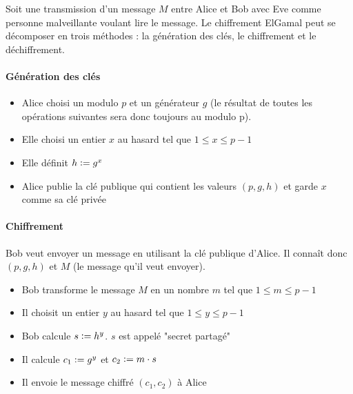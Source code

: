 \documentclass[10pt,a4paper,twoside]{article}
\newcommand{\defeq}{\vcentcolon=}
\numberwithin{equation}{section}
\begin{document}
			Soit une transmission d'un message $M$ entre Alice et Bob avec Eve comme personne malveillante voulant lire le message.
			Le chiffrement ElGamal peut se décomposer en trois méthodes : la génération des clés, le chiffrement et le déchiffrement.
			\paragraph{Génération des clés}
				\begin{itemize}
					\item Alice choisi un modulo $p$ et un générateur $g$ (le résultat de toutes les opérations suivantes sera donc toujours au modulo p).
					\item Elle choisi un entier $x$ au hasard tel que $1 \leq x \leq p-1$
					\item Elle définit $h \defeq g^x$
					\item Alice publie la clé publique qui contient les valeurs $(p,g,h)$ et garde $x$ comme sa clé privée
				\end{itemize}
				
			\paragraph{Chiffrement}
				Bob veut envoyer un message en utilisant la clé publique d'Alice. Il connaît donc $(p,g,h)$ et $M$ (le message qu'il veut envoyer).
				\begin{itemize}
					\item Bob transforme le message $M$ en un nombre $m$ tel que $1 \leq m \leq p-1$
					\item Il choisit un entier $y$ au hasard tel que $1 \leq y \leq p-1$
					\item Bob calcule $s \defeq h^y$. $s$ est appelé "secret partagé"
					\item Il calcule $c_1 \defeq g^y$ et $c_2 \defeq m\cdot s$
					\item Il envoie le message chiffré $(c_1,c_2)$ à Alice
				\end{itemize}
				
\end{document}
